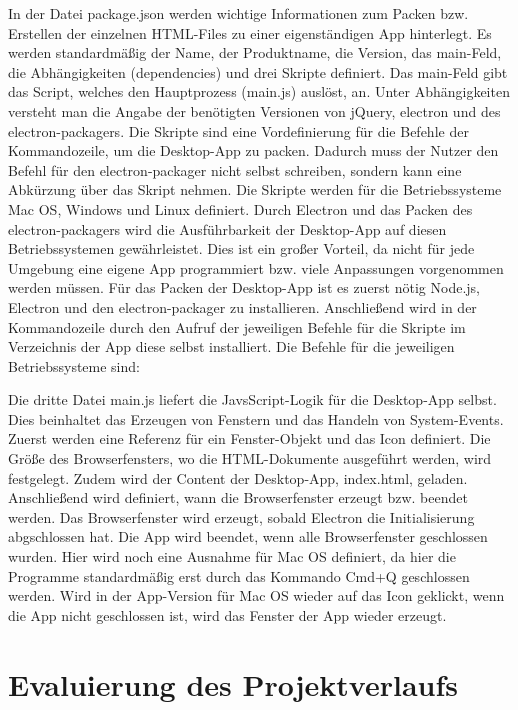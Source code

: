 In der Datei package.json werden wichtige Informationen zum Packen bzw. Erstellen der einzelnen HTML-Files zu einer eigenständigen App hinterlegt. Es werden standardmäßig der Name, der Produktname, die Version, das main-Feld, die Abhängigkeiten (dependencies) und drei Skripte definiert. Das main-Feld gibt das Script, welches den Hauptprozess (main.js) auslöst, an. Unter Abhängigkeiten versteht man die Angabe der benötigten Versionen von jQuery, electron und des electron-packagers. Die Skripte sind eine Vordefinierung für die Befehle der Kommandozeile, um die Desktop-App zu packen. Dadurch muss der Nutzer den Befehl für den electron-packager nicht selbst schreiben, sondern kann eine Abkürzung über das Skript nehmen. Die Skripte werden für die Betriebssysteme Mac OS, Windows und Linux definiert. Durch Electron und das Packen des electron-packagers wird die Ausführbarkeit der Desktop-App auf diesen Betriebssystemen gewährleistet. Dies ist ein großer Vorteil, da nicht für jede Umgebung eine eigene App programmiert bzw. viele Anpassungen vorgenommen werden müssen. Für das Packen der Desktop-App ist es zuerst nötig Node.js, Electron und den electron-packager zu installieren. Anschließend wird in der Kommandozeile durch den Aufruf der jeweiligen Befehle für die Skripte im Verzeichnis der App diese selbst installiert. Die Befehle für die jeweiligen Betriebssysteme sind:
\lstset{language=html}

Die dritte Datei main.js liefert die JavsScript-Logik für die Desktop-App selbst. Dies beinhaltet das Erzeugen von Fenstern und das Handeln von System-Events. Zuerst werden eine Referenz für ein Fenster-Objekt und das Icon definiert. Die Größe des Browserfensters, wo die HTML-Dokumente ausgeführt werden, wird festgelegt. Zudem wird der Content der Desktop-App, index.html, geladen. Anschließend wird definiert, wann die Browserfenster erzeugt bzw. beendet werden. Das Browserfenster wird erzeugt, sobald Electron die Initialisierung abgschlossen hat. Die App wird beendet, wenn alle Browserfenster geschlossen wurden. Hier wird noch eine Ausnahme für Mac OS definiert, da hier die Programme standardmäßig erst durch das Kommando Cmd+Q geschlossen werden. Wird in der App-Version für Mac OS wieder auf das Icon geklickt, wenn die App nicht geschlossen ist, wird das Fenster der App wieder erzeugt.

\section{Evaluierung des Projektverlaufs}
